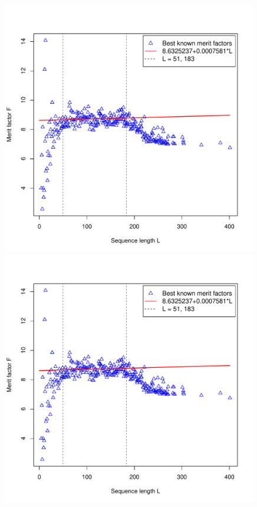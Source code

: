 \begin{figure}[t!]
\begin{minipage}{0.49\textwidth}
\vspace*{-5ex}%
\end{minipage}
~%
\begin{minipage}{0.49\textwidth}
\includegraphics[width=0.99\textwidth]{fg-R-labs-wide-4-figures-d}
\end{minipage}
%
\begin{minipage}{0.49\textwidth}
\includegraphics[width=0.99\textwidth]{fg-R-labs-wide-4-figures-d}

\end{minipage}
\end{figure}
